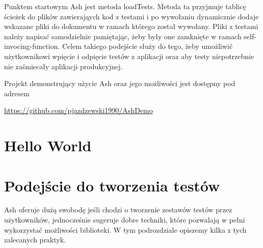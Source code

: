 \documentclass[brudnopis]{xmgr}
\begin{document}
Punktem startowym Ash jest metoda loadTests. Metoda ta przyjmuje tablicę ścieżek do plików zawierająych kod z testami i po wywołaniu dynamicznie dodaje wskazane pliki do dokumentu w ramach którego został wywołany. Pliki z testami należy napisać samodzielnie pamiętając, żeby były one zamknięte w ramach self-invocing-function. Celem takiego podejście służy do tego, żeby umożliwić użytkownikowi wpięcie i odpięcie testów z aplikacji oraz aby testy niepotrzebnie nie zaśmiecały aplikacji produkcyjnej.

Projekt demonstrujący użycie Ash oraz jego możliwości jest dostępny pod adresem

\url{https://github.com/pjazdzewski1990/AshDemo}

\section{Hello World} 

\section{Podejście do tworzenia testów}

Ash oferuje dużą swobodę jeśli chodzi o tworzenie zestawów testów przez użytkowników, jednocześnie sugeruje dobre techniki, które pozwalają w pełni wykorzystać możliwości biblioteki. W tym podrozdziale opiszemy kilka z tych zalecanych praktyk.    
\end{document}
